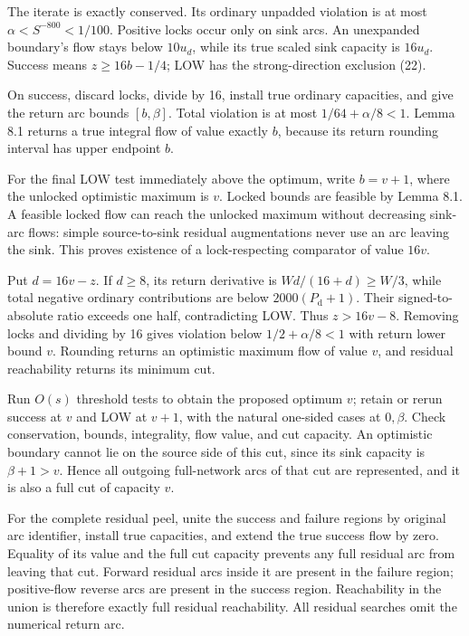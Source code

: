 The iterate is exactly conserved. Its ordinary unpadded violation is at most \(\alpha<S^{-800}<1/100\). Positive locks occur only on sink arcs. An unexpanded boundary's flow stays below \(10u_d\), while its true scaled sink capacity is \(16u_d\). Success means \(z\geq16b-1/4\); LOW has the strong-direction exclusion (22).

On success, discard locks, divide by 16, install true ordinary capacities, and give the return arc bounds \([b,\beta]\). Total violation is at most \(1/64+\alpha/8<1\). Lemma 8.1 returns a true integral flow of value exactly \(b\), because its return rounding interval has upper endpoint \(b\).

For the final LOW test immediately above the optimum, write \(b=v+1\), where the unlocked optimistic maximum is \(v\). Locked bounds are feasible by Lemma 8.1. A feasible locked flow can reach the unlocked maximum without decreasing sink-arc flows: simple source-to-sink residual augmentations never use an arc leaving the sink. This proves existence of a lock-respecting comparator of value \(16v\).

Put \(d=16v-z\). If \(d\geq8\), its return derivative is \(Wd/(16+d)\geq W/3\), while total negative ordinary contributions are below \(2000(P_{\mathrm d}+1)\). Their signed-to-absolute ratio exceeds one half, contradicting LOW. Thus \(z>16v-8\). Removing locks and dividing by 16 gives violation below \(1/2+\alpha/8<1\) with return lower bound \(v\). Rounding returns an optimistic maximum flow of value \(v\), and residual reachability returns its minimum cut.

Run \(O(s)\) threshold tests to obtain the proposed optimum \(v\); retain or rerun success at \(v\) and LOW at \(v+1\), with the natural one-sided cases at \(0,\beta\). Check conservation, bounds, integrality, flow value, and cut capacity. An optimistic boundary cannot lie on the source side of this cut, since its sink capacity is \(\beta+1>v\). Hence all outgoing full-network arcs of that cut are represented, and it is also a full cut of capacity \(v\).

For the complete residual peel, unite the success and failure regions by original arc identifier, install true capacities, and extend the true success flow by zero. Equality of its value and the full cut capacity prevents any full residual arc from leaving that cut. Forward residual arcs inside it are present in the failure region; positive-flow reverse arcs are present in the success region. Reachability in the union is therefore exactly full residual reachability. All residual searches omit the numerical return arc.

